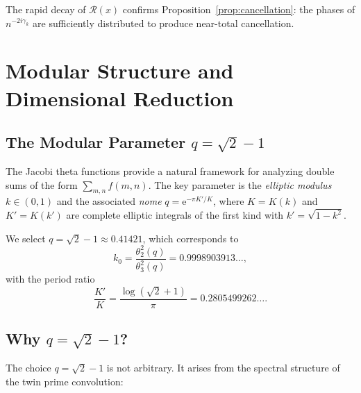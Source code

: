 \documentclass[11pt,a4paper]{article}
\theoremstyle{remark}
\newcommand{\euler}{\mathrm{e}}
\begin{document}
The rapid decay of $\mathcal{R}(x)$ confirms Proposition~\ref{prop:cancellation}: the phases of $n^{-2i\gamma_k}$ are sufficiently distributed to produce near-total cancellation.

\section{Modular Structure and Dimensional Reduction}\label{sec:modular}

\subsection{The Modular Parameter $q=\sqrt{2}-1$}

The Jacobi theta functions provide a natural framework for analyzing double sums of the form $\sum_{m,n}f(m,n)$.
The key parameter is the \emph{elliptic modulus} $k\in(0,1)$ and the associated \emph{nome} $q=\euler^{-\pi K'/K}$, where $K=K(k)$ and $K'=K(k')$ are complete elliptic integrals of the first kind with $k'=\sqrt{1-k^2}$.

We select $q=\sqrt{2}-1\approx 0.41421$, which corresponds to
\begin{equation}\label{eq:k0}
k_0 = \frac{\theta_2^2(q)}{\theta_3^2(q)} = 0.9998903913\ldots,
\end{equation}
with the period ratio
\begin{equation}\label{eq:period_ratio}
\frac{K'}{K} = \frac{\log(\sqrt{2}+1)}{\pi} = 0.2805499262\ldots.
\end{equation}

\subsection{Why $q=\sqrt{2}-1$?}

The choice $q=\sqrt{2}-1$ is not arbitrary.
It arises from the spectral structure of the twin prime convolution:
\end{document}
